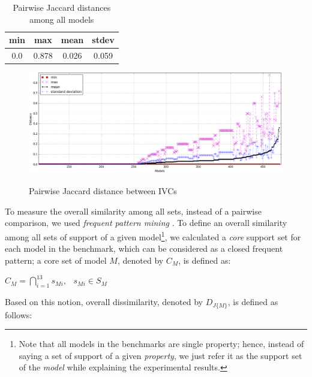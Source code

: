\begin{table}
  \caption{Pairwise Jaccard distances among all models}
  \centering
  \begin{tabular}{ |c|c|c|c| }
    \hline
     min & max & mean & stdev \\[0.5ex]
    \hline
     0.0   & 0.878 & 0.026 & 0.059 \\[0.5ex]
    \hline
  \end{tabular}
  \label{tab:jaccard-avg}
\end{table}

\begin{figure}
  \centering
  \vspace{3mm}
  \includegraphics[width=\textwidth]{figs/jacdis2.png} \\
  \vspace{-0.1in}
  \caption{Pairwise Jaccard distance between IVCs}\label{fig:jacdis}
\end{figure}

\iffalse

To measure the overall similarity among all sets, instead of a pairwise comparison, we used \emph{frequent pattern mining} \cite{han2007frequent}. To define an overall similarity among all sets of support of a given model\footnote{Note that all models in the benchmarks are single property; hence, instead of saying a set of support of a given \emph{property}, we just refer it as the support set of the \emph{model} while explaining the experimental results.}, we calculated a \emph{core} support set for each model in the benchmark, which can be considered as a closed frequent pattern; a core set of model $M$, denoted by $C_M$, is defined as:
\begin{definition}
  \label{def:core}
  $C_M = \bigcap_{i=1}^{13} s_{Mi},   \hspace{9pt} s_{Mi} \in S_M$
\end{definition}

Based on this notion, overall dissimilarity, denoted by $D_{J\{M\}}$, is defined as follows:

